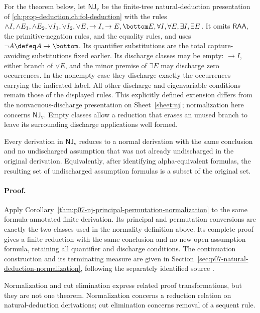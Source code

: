 For the theorem below, let \(\mathsf{NJ}_{\mathrm v}\) be the finite-tree
natural-deduction presentation of \cref{ch:prop-deduction,ch:fol-deduction}
with the rules
\(\land I,\land E_1,\land E_2,\lor I_1,\lor I_2,\lor E,\to I,\to E,
\bottom E,\forall I,\forall E,\exists I,\exists E\).  It omits
\(\mathsf{RAA}\), the primitive-negation rules, and the equality rules, and
uses \(\neg A\defeq A\to\bottom\).  Its quantifier substitutions are the total
capture-avoiding substitutions fixed earlier. Its discharge classes may be
empty: \(\to I\), either branch of \(\lor E\), and the minor premise of
\(\exists E\) may discharge zero occurrences. In the nonempty case they
discharge exactly the occurrences carrying the indicated label. All other
discharge and eigenvariable conditions remain those of the displayed rules.
This explicitly defined extension differs from the nonvacuous-discharge
presentation on Sheet~\ref{sheet:nj}; normalization here concerns
\(\mathsf{NJ}_{\mathrm v}\). Empty classes allow a reduction that erases
an unused branch to leave its surrounding discharge applications well formed.

\begin{theorem}
Every derivation in \(\mathsf{NJ}_{\mathrm v}\) reduces to a normal derivation with
the same conclusion and no undischarged assumption that was not already
undischarged in the original derivation.  Equivalently, after identifying
alpha-equivalent formulas, the resulting set of undischarged assumption
formulas is a subset of the original set.
\end{theorem}

\paragraph{Proof.}
Apply Corollary~\ref{thm:p07-nj-principal-permutation-normalization} to the
same formula-annotated finite derivation. Its principal and permutation
conversions are exactly the two classes used in the normality definition
above. Its complete proof gives a finite reduction with the same conclusion
and no new open assumption formula, retaining all quantifier and discharge
conditions. The continuation construction and its terminating measure are
given in Section~\ref{sec:p07-natural-deduction-normalization}, following
the separately identified source \cite{DeGroote2002NJPermutation}.

Normalization and cut elimination express related proof transformations, but
they are not one theorem.  Normalization concerns a reduction relation on
natural-deduction derivations; cut elimination concerns removal of a sequent
rule.
